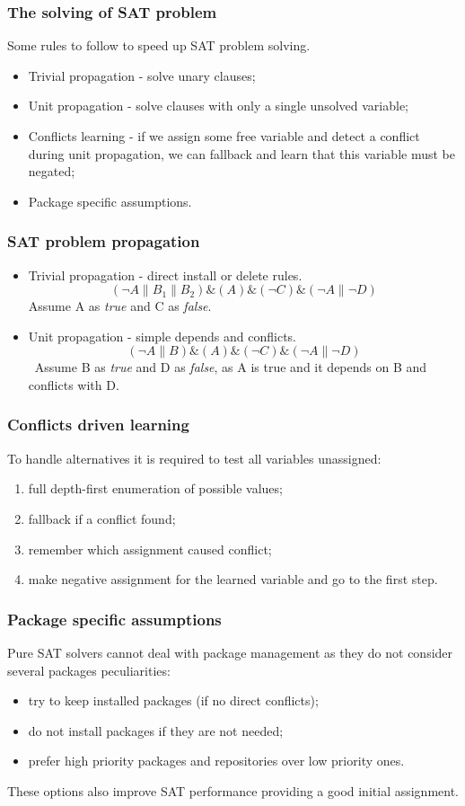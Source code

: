 \documentclass{beamer}
\begin{document}
\begin{frame}
\frametitle{The solving of SAT problem}

Some rules to follow to speed up SAT problem solving.
\begin{itemize}
  \item Trivial propagation - solve unary clauses;
  \item Unit propagation - solve clauses with only a single unsolved variable;
  \item Conflicts learning - if we assign some free variable and detect a
  conflict during unit propagation, we can fallback and learn that this variable
  must be negated;
  \item Package specific assumptions. 
\end{itemize}
\end{frame}

\begin{frame}
\frametitle{SAT problem propagation}
\begin{itemize}
  \item Trivial propagation - direct install or delete rules.
  \bigskip
  \[(\neg A \| B_1 \| B_2) \& (A) \&(\neg C) \& (\neg A \| \neg D)\]
  \bigskip
  \pause
  Assume A as \textit{true} and C as \textit{false}.
  \item Unit propagation - simple depends and conflicts.
  \bigskip
  \[(\neg A \| B) \& (A) \&(\neg C) \& (\neg A \| \neg D)\]
  \
  Assume B as \textit{true} and D as \textit{false}, as A is true and it
  depends on B and conflicts with D.
\end{itemize}
\end{frame}

\begin{frame}
\frametitle{Conflicts driven learning}
To handle alternatives it is required to test all variables unassigned:
\begin{enumerate}
  \item full depth-first enumeration of possible values;
  \item fallback if a conflict found;
  \item remember which assignment caused conflict;
  \item make negative assignment for the learned variable and go to the first
  step.
\end{enumerate}
\end{frame}

\begin{frame}
\frametitle{Package specific assumptions}
Pure SAT solvers cannot deal with package management as they do not consider
several packages peculiarities:
\begin{itemize}
  \item try to keep installed packages (if no direct conflicts);
  \item do not install packages if they are not needed;
  \item prefer high priority packages and repositories over low priority ones.
\end{itemize}
These options also improve SAT performance providing a good initial assignment.
\end{frame}
\end{document}
